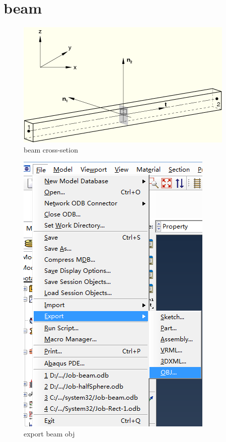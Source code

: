 \documentclass[10pt,a4paper]{article}
\begin{document}
\section{beam}
\begin{figure}[h!]
\centering
\includegraphics[width=0.7\linewidth]{beam_crosssection}
\caption{beam cross-setion}
\label{fig:beamcrosssection}
\end{figure}

\begin{figure}[h!]
\centering
\includegraphics[width=0.7\linewidth]{export_beam}
\caption{export beam obj}
\label{fig:exportbeam}
\end{figure}
\end{document}
